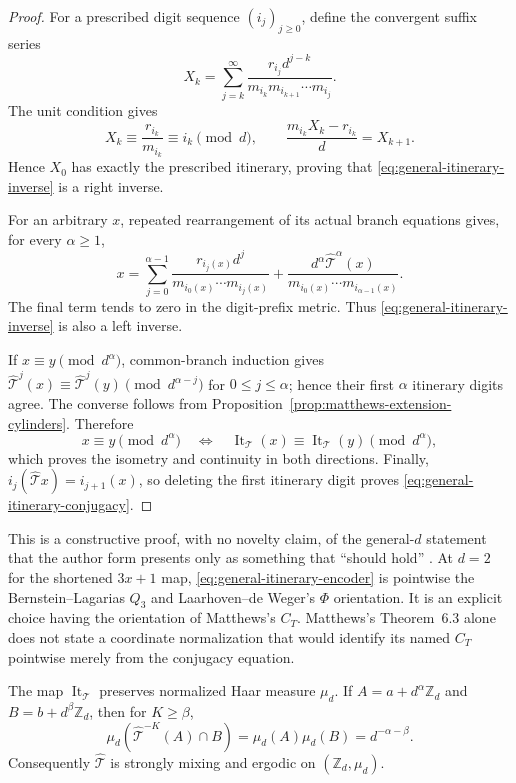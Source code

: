\begin{proof}
For a prescribed digit sequence $(i_j)_{j\geq0}$, define the convergent suffix
series
\[
 X_k=\sum_{j=k}^{\infty}
 \frac{r_{i_j}d^{j-k}}{m_{i_k}m_{i_{k+1}}\cdots m_{i_j}}.
\]
The unit condition gives
\[
 X_k\equiv\frac{r_{i_k}}{m_{i_k}}\equiv i_k\pmod d,
 \qquad
 \frac{m_{i_k}X_k-r_{i_k}}d=X_{k+1}.
\]
Hence $X_0$ has exactly the prescribed itinerary, proving that
\eqref{eq:general-itinerary-inverse} is a right inverse.

For an arbitrary $x$, repeated rearrangement of its actual branch equations
gives, for every $\alpha\geq1$,
\[
 x=
 \sum_{j=0}^{\alpha-1}
 \frac{r_{i_j(x)}d^j}{m_{i_0(x)}\cdots m_{i_j(x)}}
 +\frac{d^{\alpha}\widehat{\mathcal T}^{\alpha}(x)}
 {m_{i_0(x)}\cdots m_{i_{\alpha-1}(x)}}.
\]
The final term tends to zero in the digit-prefix metric.  Thus
\eqref{eq:general-itinerary-inverse} is also a left inverse.

If $x\equiv y\pmod{d^{\alpha}}$, common-branch induction gives
$\widehat{\mathcal T}^{j}(x)\equiv
\widehat{\mathcal T}^{j}(y)\pmod{d^{\alpha-j}}$ for
$0\leq j\leq\alpha$; hence their first $\alpha$ itinerary digits agree.
The converse follows from Proposition~\ref{prop:matthews-extension-cylinders}.
Therefore
\[
 x\equiv y\pmod{d^{\alpha}}
 \quad\Longleftrightarrow\quad
 \operatorname{It}_{\mathcal T}(x)\equiv
 \operatorname{It}_{\mathcal T}(y)\pmod{d^{\alpha}},
\]
which proves the isometry and continuity in both directions.  Finally,
$i_j(\widehat{\mathcal T}x)=i_{j+1}(x)$, so deleting the first itinerary digit
proves \eqref{eq:general-itinerary-conjugacy}.
\end{proof}

This is a constructive proof, with no novelty claim, of the general-$d$
statement that the author form presents only as something that ``should hold''
\cite[author-form p.~14]{Matthews2010AuthorForm}.  At $d=2$ for the shortened
$3x+1$ map, \eqref{eq:general-itinerary-encoder} is pointwise the
Bernstein--Lagarias $Q_3$ and Laarhoven--de Weger's $\Phi$ orientation.  It is
an explicit choice having the orientation of Matthews's $C_T$.  Matthews's
Theorem~6.3 alone does not state a coordinate normalization that would identify
its named $C_T$ pointwise merely from the conjugacy equation.

\begin{corollary}
\label{cor:Matthews-strong-mixing}
The map $\operatorname{It}_{\mathcal T}$ preserves normalized Haar measure
$\mu_d$.  If
$A=a+d^{\alpha}\mathbb Z_d$ and $B=b+d^{\beta}\mathbb Z_d$, then for
$K\geq\beta$,
\begin{equation}
\label{eq:Matthews-cylinder-mixing}
 \mu_d(\widehat{\mathcal T}^{-K}(A)\cap B)
 =\mu_d(A)\mu_d(B)=d^{-\alpha-\beta}.
\end{equation}
Consequently $\widehat{\mathcal T}$ is strongly mixing and ergodic on
$(\mathbb Z_d,\mu_d)$.
\end{corollary}

